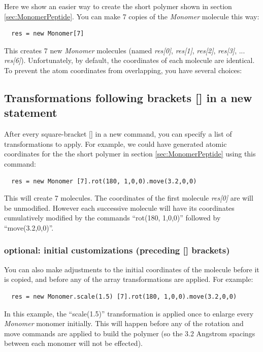 \documentclass[11pt]{article}
\begin{document}
Here we show an easier way to create the short polymer 
shown in section \ref{sec:MonomerPeptide}.
You can make 7 copies of the \textit{Monomer} molecule this way:
\begin{verbatim}
  res = new Monomer[7]
\end{verbatim}
This creates 7 new \textit{Monomer} molecules (named 
\mbox{\textit{res[0]}}, 
\mbox{\textit{res[1]}}, 
\mbox{\textit{res[2]}}, 
\mbox{\textit{res[3]}}, ... 
\mbox{\textit{res[6]}}).
Unfortunately, by default, the coordinates of each molecule are identical.
To prevent the atom coordinates from overlapping, you have several choices:

\subsection{Transformations following brackets [] in a new statement}
\label{sec:arrays+xform}
   After every square-bracket [] in a new command,
you can specify a list of transformations to apply.
For example, we could have generated atomic coordinates for the 
the short polymer in section \ref{sec:MonomerPeptide}
using this command:
\begin{verbatim}
  res = new Monomer [7].rot(180, 1,0,0).move(3.2,0,0)
\end{verbatim}
This will create 7 molecules.  
The coordinates of the first molecule \textit{res[0]} are will be unmodified.
However each successive molecule will have its coordinates cumulatively
modified by the commands ``rot(180, 1,0,0)'' followed by ``move(3.2,0,0)''.
\subsubsection*{optional: initial customizations (preceding [] brackets)}
\label{sec:xform+arrays+xform}
You can also make adjustments to the initial coordinates of the molecule
before it is copied, and before any of the array transformations are applied.
For example:
\begin{verbatim}
  res = new Monomer.scale(1.5) [7].rot(180, 1,0,0).move(3.2,0,0)
\end{verbatim}
In this example, the ``scale(1.5)'' transformation is applied once to 
enlarge every \textit{Monomer} monomer initially.
This will happen before any of the rotation and move commands 
are applied to build the polymer
(so the 3.2 Angstrom spacings between each monomer will not be effected).
\end{document}

